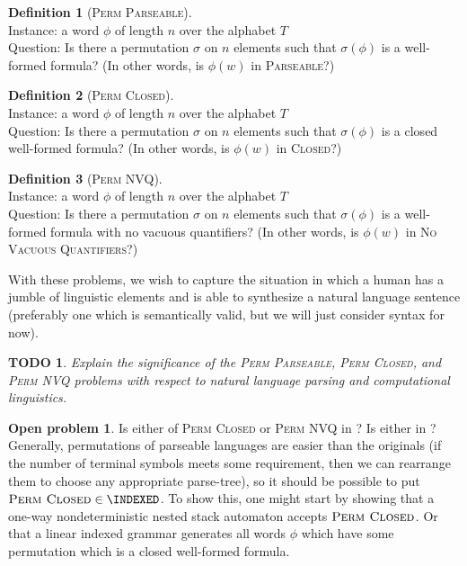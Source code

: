 \documentclass{article}
\newtheorem{todo}{TODO}
\theoremstyle{remark} \newtheorem{technicality}{Technical note}
\theoremstyle{definition} \newtheorem{definition}{Definition}
\theoremstyle{definition} \newtheorem{openproblem}{Open problem}
\newcommand{\CLOSED}{\textsc{Closed}}
\newcommand{\PARSEABLE}{\textsc{Parseable}}
\newcommand{\NVQ}{\textsc{No Vacuous Quantifiers}}
\newenvironment{langdef}[1]{\begin{definition}[#1]\mbox{}}{\end{definition}}
\newenvironment{instance}{\\Instance:}{}
\newenvironment{question}{\\Question:}{}
\newcommand{\pp}{\textsc{Perm Parseable}}
\newcommand{\pc}{\textsc{Perm Closed}}
\newcommand{\pn}{\textsc{Perm NVQ}}
\begin{document}
\begin{langdef}{\pp}
  \begin{instance}
    a word $\phi$ of length $n$ over the alphabet $T$
  \end{instance}
  \begin{question}
    Is there a permutation $\sigma$ on $n$ elements such that $\sigma(\phi)$ is a well-formed formula?
    (In other words, is $\phi(w)$ in \PARSEABLE?)
  \end{question}
\end{langdef}

\begin{langdef}{\pc}
  \begin{instance}
    a word $\phi$ of length $n$ over the alphabet $T$
  \end{instance}
  \begin{question}
    Is there a permutation $\sigma$ on $n$ elements such that $\sigma(\phi)$ is a closed well-formed formula?
    (In other words, is $\phi(w)$ in \CLOSED?)
  \end{question}
\end{langdef}

\begin{langdef}{\pn}
  \begin{instance}
    a word $\phi$ of length $n$ over the alphabet $T$
  \end{instance}
  \begin{question}
    Is there a permutation $\sigma$ on $n$ elements such that $\sigma(\phi)$ is a well-formed formula with no vacuous quantifiers?
    (In other words, is $\phi(w)$ in \NVQ?)
  \end{question}
\end{langdef}

With these problems, we wish to capture the situation in which a human has a jumble of linguistic elements and is able to synthesize a natural language sentence (preferably one which is semantically valid, but we will just consider syntax for now).

\begin{todo}
  Explain the significance of the \pp, \pc, and \pn{} problems with respect to natural language parsing and computational linguistics.
\end{todo}

\begin{openproblem}
  Is either of \pc{} or \pn{} in \INDEXED?
  Is either in \MCSL?
  Generally, permutations of parseable languages are easier than the originals (if the number of terminal symbols meets some requirement, then we can rearrange them to choose any appropriate parse-tree), so it should be possible to put $\pc \in \INDEXED$.
  To show this, one might start by showing that a one-way nondeterministic nested stack automaton accepts $\pc$.
  Or that a linear indexed grammar generates all words $\phi$ which have some permutation which is a closed well-formed formula.
\end{openproblem}
\end{document}
